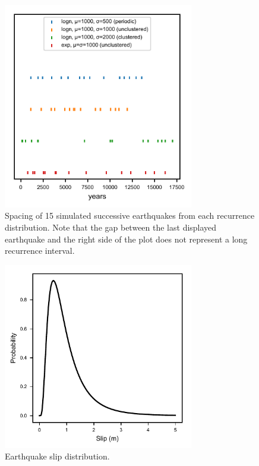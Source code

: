 \documentclass[se, manuscript]{copernicus}
\begin{document}
\clearpage

\begin{figure}[t]
  \includegraphics[width=8.3cm]{./figures/event_spacing.pdf}
  \caption{Spacing of 15 simulated successive earthquakes from each recurrence 
  distribution. Note that the gap between the last displayed earthquake and the 
  right side of the plot does not represent a long recurrence interval. 
  \label{eq_spacing}}
\end{figure}

\clearpage

\begin{figure}[t]
\includegraphics[width=8.3cm]{./figures/slip_dist.pdf}
\caption{Earthquake slip distribution. \label{slip_dist}}
\end{figure}

\clearpage
\end{document}
